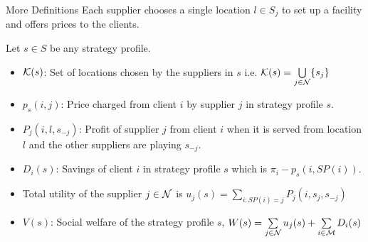 \documentclass[aspectratio=1610,handout]{beamer}
\begin{document}
\begin{frame}{More Definitions}
Each supplier chooses a single location $l\in S_j$ to set up a facility and offers prices  to the clients. \pause

Let $s\in S$ be any strategy profile.\begin{itemize}
    \item $\mathcal{K}(s)$: Set of locations chosen by the suppliers in $s$ i.e. $\mathcal{K}(s)=\bigcup\limits_{j\in\mathcal{N}}\{s_j\}$\pause
    
    \item $p_s(i,j)$: Price charged from client $i$ by supplier $j$ in strategy profile $s$.\vspace*{3mm}\pause
    
    \item $P_j(i,l,s_{-j})$: Profit of supplier $j$ from client $i$ when it is served from location $l$ and the other suppliers are playing $s_{-j}$.\vspace*{3mm}\pause
    
    \item $D_i(s)$: Savings of client $i$ in strategy profile $s$ which is $\pi_i-p_s(i,SP(i))$.\vspace*{3mm}\pause
    
    \item Total utility of the supplier $j\in\mathcal{N}$ is $u_j(s)=\sum\limits_{i:SP(i)=j}P_j(i,s_j,s_{-j})$\pause
    
    
    \item $V(s)$: Social welfare of the strategy profile  $s$, $W(s)=\sum\limits_{j\in\mathcal{N}}u_j(s)+\sum\limits_{i\in\mathcal{M}}D_i(s)$
\end{itemize}

\end{frame}
\end{document}
